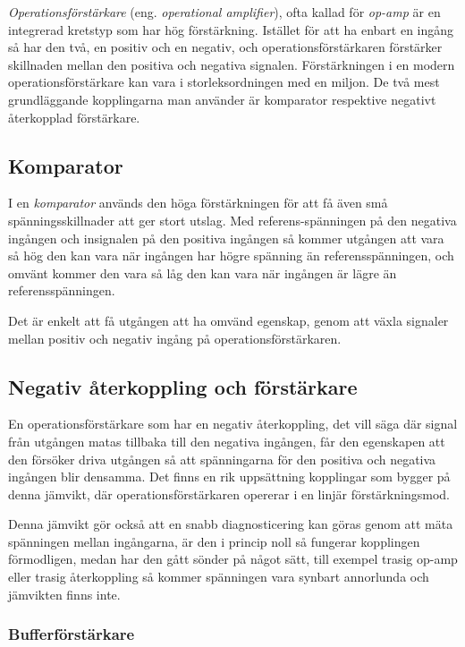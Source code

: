 \emph{Operationsförstärkare} (eng. \emph{operational amplifier}), ofta kallad
för \emph{op-amp} är en integrerad kretstyp som har hög förstärkning.
Istället för att ha enbart en ingång så har den två, en positiv
och en negativ, och operationsförstärkaren förstärker skillnaden mellan den
positiva och negativa signalen. Förstärkningen i en modern operationsförstärkare
kan vara i storleksordningen med en miljon.
De två mest grundläggande kopplingarna man använder är komparator respektive
negativt återkopplad förstärkare.

\subsection{Komparator}

I en \emph{komparator} används den höga förstärkningen för att få även små
spänningsskillnader att ger stort utslag. Med referens-spänningen på den
negativa ingången och insignalen på den positiva ingången så kommer utgången
att vara så hög den kan vara när ingången har högre spänning än
referensspänningen, och omvänt kommer den vara så låg den kan vara när ingången
är lägre än referensspänningen.

Det är enkelt att få utgången att ha omvänd egenskap, genom att växla signaler
mellan positiv och negativ ingång på operationsförstärkaren.

\subsection{Negativ återkoppling och förstärkare}

En operationsförstärkare som har en negativ återkoppling, det vill säga där signal från
utgången matas tillbaka till den negativa ingången, får den egenskapen att den
försöker driva utgången så att spänningarna för den positiva och negativa
ingången blir densamma.
Det finns en rik uppsättning kopplingar som bygger på denna jämvikt, där
operationsförstärkaren opererar i en linjär förstärkningsmod.

Denna jämvikt gör också att en snabb diagnosticering kan göras genom att mäta
spänningen mellan ingångarna, är den i princip noll så fungerar kopplingen
förmodligen, medan har den gått sönder på något sätt, till exempel trasig op-amp
eller trasig återkoppling så kommer spänningen vara synbart annorlunda och
jämvikten finns inte.

\subsubsection{Bufferförstärkare}

